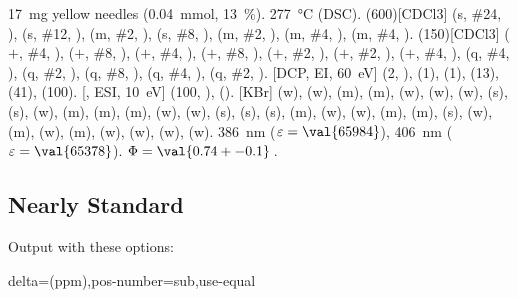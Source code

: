 \documentclass{chemmacros-manual}
\begin{document}
\begin{sourcecode}
  \begin{experimental}[<options>]
     \qty{17}{\milli\gram} yellow needles (\qty{0.04}{\milli\mole},
      \qty{13}{\percent}).
     \qty{277}{\celsius} (DSC).
    \NMR(600)[CDCl3]  (s, \#{24}, ),  (s, \#{12},
    ),  (m, \#{2}, ),  (s, \#{8},
    ),  (m, \#{2}, ),  (m, \#{4},
    ),  (m, \#{4}, ).
    (150)[CDCl3]  ($+$, \#{4}, ),  ($+$,
    \#{8}, ),  ($+$, \#{4}, ),  ($+$, \#{8},
    ),  ($+$, \#{2}, ),  ($+$, \#{2},
    ),  ($+$, \#{4}, ),  (q, \#{4},
    ),  (q, \#{2}, ),  (q, \#{8}, ),
     (q, \#{4}, ),  (q, \#{2}, ).
    [DCP, EI, \qty{60}{\electronvolt}]  (2, ), 
    (1),  (1),  (13),  (41),  (100).
    [, ESI, \qty{10}{\electronvolt}]  (100,
    ),  ().
    [KBr]  (w),  (w),  (m), 
    (m),  (w),  (w),  (w),  (s),
     (s),  (w),  (m),  (m), 
    (m),  (w),  (w),  (s),  (s),
     (s),  (m),  (w),  (w), 
    (m),  (m),  (s),  (w),  (m), 
    (w),  (m),  (w),  (w),  (w), 
    (w).
     \qty{386}{\nano\metre} ($\varepsilon = \val{65984}$),
    \qty{406}{\nano\metre} ($\varepsilon = \val{65378}$).
     $\Phi = \val{0.74+-0.1}$\,.
  \end{experimental}
\end{sourcecode}

\subsection{Nearly Standard}
Output with these options:

\begin{sourcecode}
  delta=(ppm),pos-number=sub,use-equal
\end{sourcecode}
\end{document}
